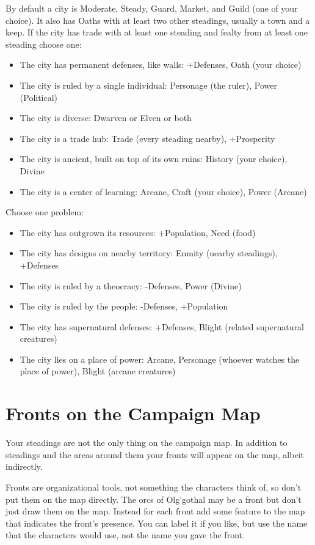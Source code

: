  By default a city is Moderate, Steady, Guard, Market, and Guild (one of your choice). It also has Oaths with at least two other steadings, usually a town and a keep. If the city has trade with at least one steading and fealty from at least one steading choose one:
\begin{itemize}
\item The city has permanent defenses, like walls: +Defenses, Oath (your choice)
\item The city is ruled by a single individual: Personage (the ruler), Power (Political)
\item The city is diverse: Dwarven or Elven or both
\item The city is a trade hub: Trade (every steading nearby), +Prosperity
\item The city is ancient, built on top of its own ruins: History (your choice), Divine
\item The city is a center of learning: Arcane, Craft (your choice), Power (Arcane)

\end{itemize}


 Choose one problem:
\begin{itemize}
\item The city has outgrown its resources: +Population, Need (food)
\item The city has designs on nearby territory: Enmity (nearby steadings), +Defenses
\item The city is ruled by a theocracy: -Defenses, Power (Divine)
\item The city is ruled by the people: -Defenses, +Population
\item The city has supernatural defenses: +Defenses, Blight (related supernatural creatures)
\item The city lies on a place of power: Arcane, Personage (whoever watches the place of power), Blight (arcane creatures)

\end{itemize}
\section*{Fronts on the Campaign Map}


 Your steadings are not the only thing on the campaign map. In addition to steadings and the areas around them your fronts will appear on the map, albeit indirectly.


 Fronts are organizational tools, not something the characters think of, so don't put them on the map directly. The orcs of Olg'gothal may be a front but don't just draw them on the map. Instead for each front add some feature to the map that indicates the front's presence. You can label it if you like, but use the name that the characters would use, not the name you gave the front.


